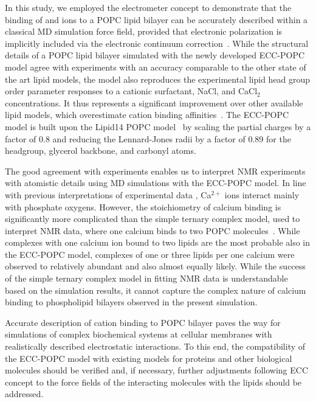 \documentclass[aip,jcp,twocolumn]{revtex4}
\begin{document}
In this study, we employed the electrometer concept to demonstrate that the binding of  and  ions to a POPC lipid bilayer can be accurately described within a classical MD simulation force field, provided that electronic polarization is implicitly included via the electronic continuum correction~\cite{leontyev11}. While the structural details of a POPC lipid bilayer simulated with the newly developed ECC-POPC model agree with experiments with an accuracy comparable to the other state of the art lipid models, the model also reproduces the experimental lipid head group order parameter responses to a cationic surfactant, NaCl, and CaCl$_2$ concentrations. It thus represents a significant improvement over other available lipid models, which overestimate cation binding affinities~\cite{catte16}. The ECC-POPC model is built upon the Lipid14 POPC model~\cite{dickson14} by scaling the partial charges by a factor of 0.8 and reducing the Lennard-Jones radii by a factor of 0.89 for the headgroup, glycerol backbone, and carbonyl atoms. 

The good agreement with experiments enables us to interpret NMR experiments with atomistic details using MD simulations with the ECC-POPC model. In line with previous interpretations of experimental data \cite{hauser76,hauser78,herbette84,binder02}, Ca$^{2+}$ ions interact mainly with phosphate oxygens. However, the stoichiometry of calcium binding is significantly more complicated than the simple ternary complex model, used to interpret NMR data, where one calcium binds to two POPC molecules~\cite{altenbach84}. While complexes with one calcium ion bound to two lipids are the most probable also in the ECC-POPC model, complexes of one or three lipids per one calcium were observed to relatively abundant and also almost equally likely. While the success of the simple ternary complex model in fitting NMR data is understandable based on the simulation results, it cannot capture the complex nature of calcium binding to phospholipid bilayers observed in the present simulation.

Accurate description of cation binding to POPC bilayer paves the way for simulations of complex biochemical systems at cellular membranes with realistically described electrostatic interactions. To this end, the compatibility of the ECC-POPC model with existing models for proteins and other biological molecules should be verified and, if necessary, further adjustments following ECC concept to the force fields of the interacting molecules with the lipids should be addressed.
\end{document}
